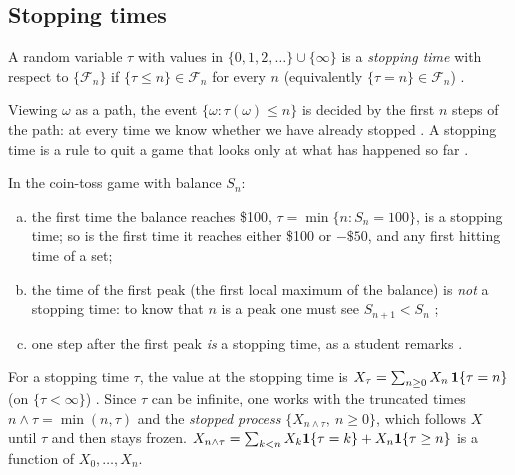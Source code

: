 \begin{paracol}{2}
\subsection{Stopping times}
\begin{definition}\label{ch04:def-stop}
A random variable $\tau$ with values in $\{0,1,2,\dots\}\cup\{\infty\}$ is a \emph{stopping time} with respect to
$\{\mathcal F_n\}$ if $\{\tau\le n\}\in\mathcal F_n$ for every $n$ (equivalently $\{\tau=n\}\in\mathcal F_n$)
.
\end{definition}
Viewing $\omega$ as a path, the event $\{\omega:\tau(\omega)\le n\}$ is decided by the first $n$ steps of the path:
at every time we know whether we have already stopped . A stopping time is a rule to quit a
game that looks only at what has happened so far .

\begin{example}\label{ch04:ex-stop}
In the coin-toss game with balance $S_n$:
\begin{enumerate}[(a)]
  \item the first time the balance reaches \$100, $\tau=\min\{n:S_n=100\}$, is a stopping time; so is the first
        time it reaches either \$100 or $-\$50$, and any first hitting time of a set;
  \item the time of the first peak (the first local maximum of the balance) is \emph{not} a stopping time:
        to know that $n$ is a peak one must see $S_{n+1}<S_n$ ;
  \item one step after the first peak \emph{is} a stopping time, as a student remarks .
\end{enumerate}
\end{example}

\begin{definition}
For a stopping time $\tau$, the value at the stopping time is $X_\tau=\sum_{n\ge0}X_n\,\mathbf{1}\{\tau=n\}$ (on
$\{\tau<\infty\}$) . Since $\tau$ can be infinite, one works with the truncated times
$n\wedge\tau=\min(n,\tau)$  and the \emph{stopped process} $\{X_{n\wedge\tau},\ n\ge0\}$, which
follows $X$ until $\tau$ and then stays frozen. $X_{n\wedge\tau}=\sum_{k<n}X_k\mathbf{1}\{\tau=k\}+X_n\mathbf{1}\{\tau\ge n\}$ is a
function of $X_0,\dots,X_n$.
\end{definition}


\end{paracol}
